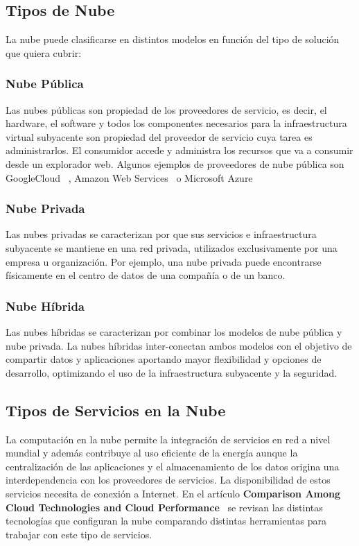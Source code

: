 \documentclass[a4paper,11pt]{book}
\begin{document}
\subsection{Tipos de Nube}

La nube puede clasificarse en distintos modelos en función del tipo de solución que quiera cubrir:

\subsubsection{Nube Pública}

Las nubes públicas son propiedad de los proveedores de servicio, es decir, el hardware, el software y todos los componentes necesarios para la infraestructura virtual subyacente son propiedad del proveedor de servicio cuya tarea es administrarlos. El consumidor accede y administra los recursos que va a consumir desde un explorador web.  Algunos ejemplos de proveedores de nube pública son GoogleCloud~\cite{gcp} , Amazon Web Services~\cite{aws} o Microsoft Azure~\cite{azure}

\subsubsection{Nube Privada}
Las nubes privadas se caracterizan por que sus servicios e infraestructura subyacente se mantiene en una red privada, utilizados exclusivamente por una empresa u organización. Por ejemplo, una nube privada puede encontrarse físicamente en el centro de datos de una compañía o de un banco.

\subsubsection{Nube Híbrida}

Las nubes híbridas se caracterizan por combinar los modelos de nube pública y nube privada. La nubes híbridas inter-conectan ambos modelos con el objetivo de compartir datos y aplicaciones aportando mayor flexibilidad y opciones de desarrollo, optimizando el uso de la infraestructura subyacente y la seguridad.


\subsection{Tipos de Servicios en la Nube}

La computación en la nube permite la integración de servicios en red a nivel mundial y además contribuye al uso eficiente de la energía aunque la centralización de las aplicaciones y el almacenamiento de los datos origina una interdependencia con los proveedores de servicios. La disponibilidad de estos servicios necesita de conexión a Internet.  En el artículo \textbf{Comparison Among Cloud Technologies and Cloud Performance}~\cite{cloudtech} se revisan las distintas tecnologías que configuran la nube comparando distintas herramientas para trabajar con este tipo de servicios.
\end{document}

